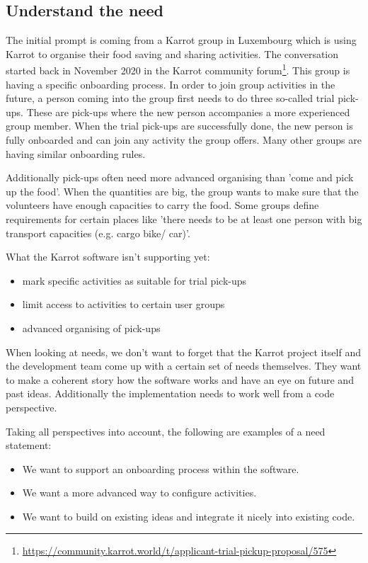 \documentclass[
	a4paper,%
	11pt,%
	]{article}
\begin{document}

\subsection{Understand the need}

The initial prompt is coming from a Karrot group in Luxembourg which is using Karrot to organise their food saving and sharing activities. The conversation started back in November 2020 in the Karrot community forum\footnote{\label{url_forum_2020}\url{https://community.karrot.world/t/applicant-trial-pickup-proposal/575}}. This group is having a specific  onboarding process. In order to join group activities in the future, a person coming into the group first needs to do three so-called trial pick-ups. These are pick-ups where the new person accompanies a more experienced group member. When the trial pick-ups are successfully done, the new person is fully onboarded and can join any activity the group offers. Many other groups are having similar onboarding rules. 

Additionally pick-ups often need more advanced organising than 'come and pick up the food'. When the quantities are big, the group wants to make sure that the volunteers have enough capacities to carry the food. Some groups define requirements for certain places like 'there needs to be at least one person with big transport capacities (e.g. cargo bike/ car)'. 

What the Karrot software isn't supporting yet:
\begin{itemize}
    \item mark specific activities as suitable for trial pick-ups
    \item limit access to activities to certain user groups
    \item advanced organising of pick-ups
\end{itemize}

When looking at needs, we don't want to forget that the Karrot project itself and the development team come up with a certain set of needs themselves. They want to make a coherent story how the software works and have an eye on future and past ideas. Additionally the implementation needs to work well from a code perspective.

Taking all perspectives into account, the following are examples of a need statement:
\begin{itemize}
    \item We want to support an onboarding process within the software.
    \item We want a more advanced way to configure activities.
    \item We want to build on existing ideas and integrate it nicely into existing code.
\end{itemize}
\end{document}

